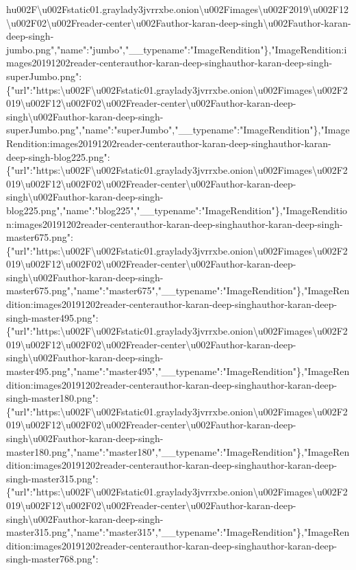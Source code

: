 h{}u002F\textbackslash{}u002Fstatic01.graylady3jvrrxbe.onion\textbackslash{}u002Fimages\textbackslash{}u002F2019\textbackslash{}u002F12\textbackslash{}u002F02\textbackslash{}u002Freader-center\textbackslash{}u002Fauthor-karan-deep-singh\textbackslash{}u002Fauthor-karan-deep-singh-jumbo.png","name":"jumbo","\_\_typename":"ImageRendition"\},"ImageRendition:images20191202reader-centerauthor-karan-deep-singhauthor-karan-deep-singh-superJumbo.png":\{"url":"https:\textbackslash{}u002F\textbackslash{}u002Fstatic01.graylady3jvrrxbe.onion\textbackslash{}u002Fimages\textbackslash{}u002F2019\textbackslash{}u002F12\textbackslash{}u002F02\textbackslash{}u002Freader-center\textbackslash{}u002Fauthor-karan-deep-singh\textbackslash{}u002Fauthor-karan-deep-singh-superJumbo.png","name":"superJumbo","\_\_typename":"ImageRendition"\},"ImageRendition:images20191202reader-centerauthor-karan-deep-singhauthor-karan-deep-singh-blog225.png":\{"url":"https:\textbackslash{}u002F\textbackslash{}u002Fstatic01.graylady3jvrrxbe.onion\textbackslash{}u002Fimages\textbackslash{}u002F2019\textbackslash{}u002F12\textbackslash{}u002F02\textbackslash{}u002Freader-center\textbackslash{}u002Fauthor-karan-deep-singh\textbackslash{}u002Fauthor-karan-deep-singh-blog225.png","name":"blog225","\_\_typename":"ImageRendition"\},"ImageRendition:images20191202reader-centerauthor-karan-deep-singhauthor-karan-deep-singh-master675.png":\{"url":"https:\textbackslash{}u002F\textbackslash{}u002Fstatic01.graylady3jvrrxbe.onion\textbackslash{}u002Fimages\textbackslash{}u002F2019\textbackslash{}u002F12\textbackslash{}u002F02\textbackslash{}u002Freader-center\textbackslash{}u002Fauthor-karan-deep-singh\textbackslash{}u002Fauthor-karan-deep-singh-master675.png","name":"master675","\_\_typename":"ImageRendition"\},"ImageRendition:images20191202reader-centerauthor-karan-deep-singhauthor-karan-deep-singh-master495.png":\{"url":"https:\textbackslash{}u002F\textbackslash{}u002Fstatic01.graylady3jvrrxbe.onion\textbackslash{}u002Fimages\textbackslash{}u002F2019\textbackslash{}u002F12\textbackslash{}u002F02\textbackslash{}u002Freader-center\textbackslash{}u002Fauthor-karan-deep-singh\textbackslash{}u002Fauthor-karan-deep-singh-master495.png","name":"master495","\_\_typename":"ImageRendition"\},"ImageRendition:images20191202reader-centerauthor-karan-deep-singhauthor-karan-deep-singh-master180.png":\{"url":"https:\textbackslash{}u002F\textbackslash{}u002Fstatic01.graylady3jvrrxbe.onion\textbackslash{}u002Fimages\textbackslash{}u002F2019\textbackslash{}u002F12\textbackslash{}u002F02\textbackslash{}u002Freader-center\textbackslash{}u002Fauthor-karan-deep-singh\textbackslash{}u002Fauthor-karan-deep-singh-master180.png","name":"master180","\_\_typename":"ImageRendition"\},"ImageRendition:images20191202reader-centerauthor-karan-deep-singhauthor-karan-deep-singh-master315.png":\{"url":"https:\textbackslash{}u002F\textbackslash{}u002Fstatic01.graylady3jvrrxbe.onion\textbackslash{}u002Fimages\textbackslash{}u002F2019\textbackslash{}u002F12\textbackslash{}u002F02\textbackslash{}u002Freader-center\textbackslash{}u002Fauthor-karan-deep-singh\textbackslash{}u002Fauthor-karan-deep-singh-master315.png","name":"master315","\_\_typename":"ImageRendition"\},"ImageRendition:images20191202reader-centerauthor-karan-deep-singhauthor-karan-deep-singh-master768.png":\